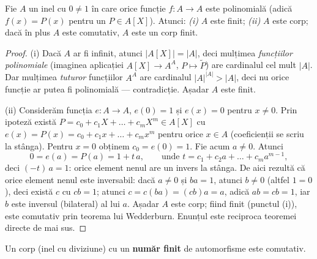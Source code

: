 \begin{propozitie}\label{prop:functiipolrecip}
Fie $A$ un inel cu $0\neq1$ în care orice funcție $f:A\to A$ este polinomială (adică $f(x)=P(x)$ pentru un $P\in A[X]$). Atunci:
\emph{(i)} $A$ este finit;
\emph{(ii)} $A$ este corp; dacă în plus $A$ este comutativ, $A$ este un corp finit.
\end{propozitie}
\begin{proof}
(i) Dacă $A$ ar fi infinit, atunci $|A[X]|=|A|$, deci mulțimea \emph{funcțiilor polinomiale} (imaginea aplicației $A[X]\to A^A$, $P\mapsto\widetilde P$) are cardinalul cel mult $|A|$. Dar mulțimea \emph{tuturor} funcțiilor $A^A$ are cardinalul $|A|^{|A|}>|A|$, deci nu orice funcție ar putea fi polinomială --- contradicție. Așadar $A$ este finit.

(ii) Considerăm funcția $e:A\to A$, $e(0)=1$ și $e(x)=0$ pentru $x\neq0$. Prin ipoteză există $P=c_0+c_1X+\dots+c_mX^m\in A[X]$ cu $e(x)=P(x)=c_0+c_1x+\dots+c_mx^m$ pentru orice $x\in A$ (coeficienții se scriu la stânga). Pentru $x=0$ obținem $c_0=e(0)=1$. Fie acum $a\neq0$. Atunci
\[
0=e(a)=P(a)=1+t\,a,\qquad\text{unde } t=c_1+c_2a+\dots+c_ma^{m-1},
\]
deci $(-t)\,a=1$: orice element nenul are un invers la stânga. De aici rezultă că orice element nenul este inversabil: dacă $a\neq0$ și $ba=1$, atunci $b\neq0$ (altfel $1=0$), deci există $c$ cu $cb=1$; atunci $c=c(ba)=(cb)a=a$, adică $ab=cb=1$, iar $b$ este inversul (bilateral) al lui $a$. Așadar $A$ este corp; fiind finit (punctul (i)), este comutativ prin teorema lui Wedderburn. Enunțul este reciproca teoremei directe de mai sus.
\end{proof}

\begin{teorema}\label{teo:autcorp}
Un corp (inel cu diviziune) cu un \textbf{număr finit} de automorfisme este comutativ.
\end{teorema}

